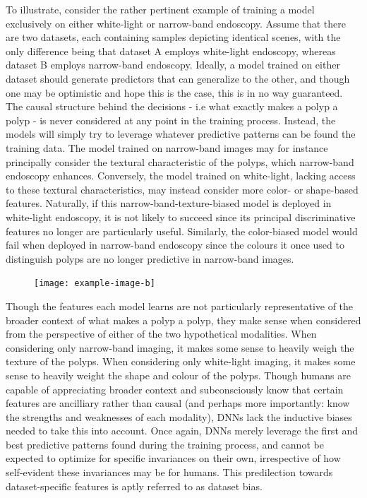		To illustrate, consider the rather pertinent example of training a model exclusively on either white-light or narrow-band endoscopy. Assume that there are two datasets, each containing samples depicting identical scenes, with the only difference being that dataset A employs white-light endoscopy, whereas dataset B employs narrow-band endoscopy. Ideally, a model trained on either dataset should generate predictors that can generalize to the other, and though one may be optimistic and hope this is the case, this is in no way guaranteed. The causal structure behind the decisions - i.e what exactly makes a polyp a polyp - is never considered at any point in the training process. Instead, the models will simply try to leverage whatever predictive patterns can be found the training data. The model trained on narrow-band images may for instance principally consider the textural characteristic of the polyps, which narrow-band endoscopy enhances. Conversely, the model trained on white-light, lacking access to these textural characteristics, may instead consider more color- or shape-based features. Naturally, if this narrow-band-texture-biased model is deployed in white-light endoscopy, it is not likely to succeed since its principal discriminative features no longer are particularly useful. Similarly, the color-biased model would fail when deployed in narrow-band endoscopy since the colours it once used to distinguish polyps are no longer predictive in narrow-band images.  

		\begin{figure}[H]
			\texttt{[image: example-image-b]}
			\caption{}
			\label{imaging_modalities}
		\end{figure}

		Though the features each model learns are not particularly representative of the broader context of what makes a polyp a polyp, they make sense when considered from the perspective of either of the two hypothetical modalities. When considering only narrow-band imaging, it makes some sense to heavily weigh the texture of the polyps. When considering only white-light imaging, it makes some sense to heavily weight the shape and colour of the polyps. Though humans are capable of appreciating broader context and subconsciously know that certain features are ancilliary rather than causal (and perhaps more importantly: know the strengths and weaknesses of each modality), DNNs lack the inductive biases needed to take this into account. Once again, DNNs merely leverage the first and best predictive patterns found during the training process, and cannot be expected to optimize for specific invariances on their own, irrespective of how self-evident these invariances may be for humans. This predilection towards dataset-specific features is aptly referred to as dataset bias. 
		
